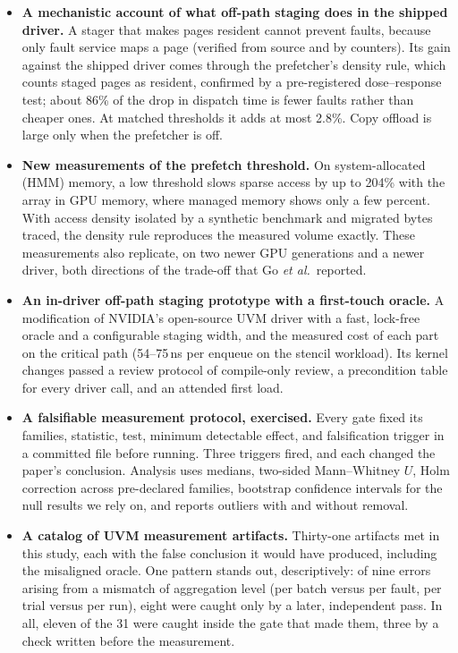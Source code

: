 \begin{itemize}
  \item \textbf{A mechanistic account of what off-path staging does in the
  shipped driver.} A stager that makes pages resident cannot prevent faults,
  because only fault service maps a page (verified from source and by
  counters). Its gain against the shipped driver comes through the
  prefetcher's density rule, which counts staged pages as resident, confirmed
  by a pre-registered dose--response test; about 86\% of the drop in dispatch
  time is fewer faults rather than cheaper ones. At matched thresholds it adds
  at most 2.8\%. Copy offload is large only when the prefetcher is off.

  \item \textbf{New measurements of the prefetch threshold.} On system-allocated
  (HMM) memory, a low threshold slows sparse access by up to 204\% with the
  array in GPU memory, where managed memory shows only a few percent. With
  access density isolated by a synthetic benchmark and migrated bytes traced, the
  density rule reproduces the measured volume exactly. These measurements also
  replicate, on two newer GPU generations and a newer driver, both directions
  of the trade-off that Go \emph{et al.}\ reported.

  \item \textbf{An in-driver off-path staging prototype with a first-touch
  oracle.} A modification of NVIDIA's open-source UVM driver with a fast,
  lock-free oracle and a configurable staging width, and the measured cost of
  each part on the critical path (54--75\,ns per enqueue on the stencil
  workload). Its kernel changes passed a review protocol of compile-only review,
  a precondition table for every driver call, and an attended first load.

  \item \textbf{A falsifiable measurement protocol, exercised.} Every gate fixed
  its families, statistic, test, minimum detectable effect, and falsification
  trigger in a committed file before running. Three triggers fired, and each
  changed the paper's conclusion. Analysis uses medians, two-sided
  Mann--Whitney $U$, Holm correction across pre-declared families, bootstrap
  confidence intervals for the null results we rely on, and reports outliers
  with and without removal.

  \item \textbf{A catalog of UVM measurement artifacts.} Thirty-one artifacts
  met in this study, each with the false conclusion it would have produced,
  including the misaligned oracle. One pattern stands out, descriptively: of
  nine errors arising from a mismatch of aggregation level (per batch versus per
  fault, per trial versus per run), eight were caught only by a later,
  independent pass. In all, eleven of the 31 were caught inside the gate that
  made them, three by a check written before the measurement.
\end{itemize}

